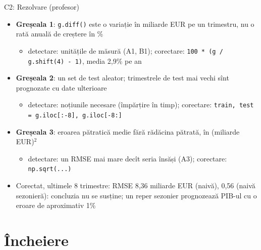 \ifsolutions
\begin{frame}{C2: Rezolvare (profesor)}
\itemsize{\footnotesize}
\begin{itemize}
    \item \textbf{Greșeala 1}: \texttt{g.diff()} este o variație în miliarde EUR pe un trimestru, nu o rată anuală de creștere în \%
    \begin{itemize}
        \item detectare: unitățile de măsură (A1, B1); corectare: \texttt{100 * (g / g.shift(4) - 1)}, media 2{,}9\% pe an
    \end{itemize}
    \item \textbf{Greșeala 2}: un set de test aleator; trimestrele de test mai vechi sînt prognozate cu date ulterioare
    \begin{itemize}
        \item detectare: noțiunile necesare (împărțire în timp); corectare: \texttt{train, test = g.iloc[:-8], g.iloc[-8:]}
    \end{itemize}
    \item \textbf{Greșeala 3}: eroarea pătratică medie fără rădăcina pătrată, în (miliarde EUR)$^2$
    \begin{itemize}
        \item detectare: un RMSE mai mare decît seria însăși (A3); corectare: \texttt{np.sqrt(...)}
    \end{itemize}
    \item Corectat, ultimele 8 trimestre: RMSE 8{,}36 miliarde EUR (naivă), 0{,}56 (naivă sezonieră): concluzia nu se susține; un reper sezonier prognozează PIB-ul cu o eroare de aproximativ 1\%
\end{itemize}
\end{frame}
\fi


\section{Încheiere}

